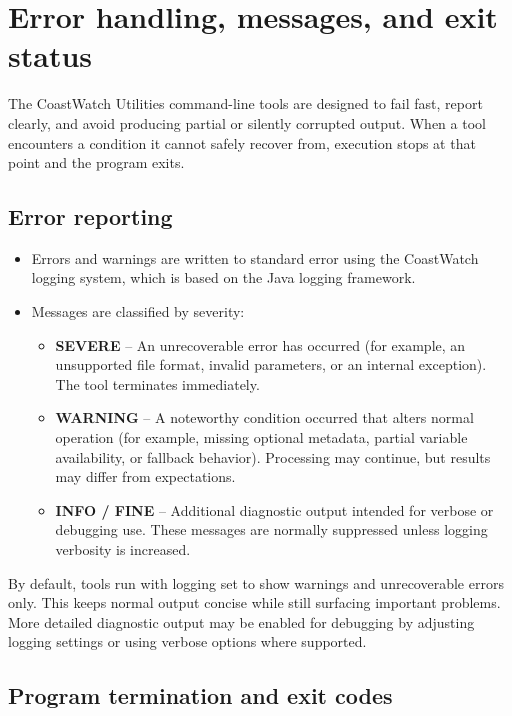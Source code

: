 \section{Error handling, messages, and exit status}

The CoastWatch Utilities command-line tools are designed to fail fast, report clearly, and avoid producing partial or silently corrupted output. When a tool encounters a condition it cannot safely recover from, execution stops at that point and the program exits.

\subsection*{Error reporting}

\begin{itemize}
  \item Errors and warnings are written to standard error using the CoastWatch logging system, which is based on the Java logging framework.
  \item Messages are classified by severity:
    \begin{itemize}
      \item \textbf{SEVERE} -- An unrecoverable error has occurred (for example, an unsupported file format, invalid parameters, or an internal exception). The tool terminates immediately.
      \item \textbf{WARNING} -- A noteworthy condition occurred that alters normal operation (for example, missing optional metadata, partial variable availability, or fallback behavior). Processing may continue, but results may differ from expectations.
      \item \textbf{INFO / FINE} -- Additional diagnostic output intended for verbose or debugging use. These messages are normally suppressed unless logging verbosity is increased.
    \end{itemize}
\end{itemize}

By default, tools run with logging set to show warnings and unrecoverable errors only. This keeps normal output concise while still surfacing important problems. More detailed diagnostic output may be enabled for debugging by adjusting logging settings or using verbose options where supported.

\subsection*{Program termination and exit codes}

